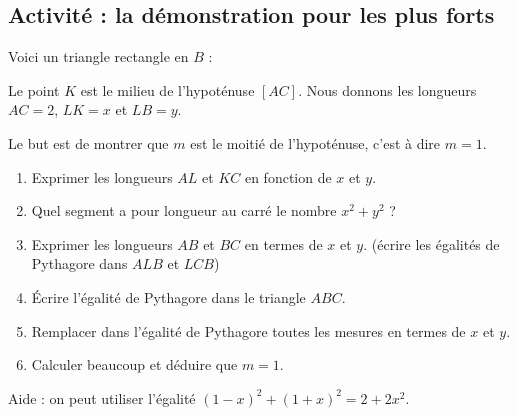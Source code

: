 
\subsection*{Activité : la démonstration pour les plus forts}

Voici un triangle rectangle en \( B\) :

\begin{center}

\end{center}
Le point \( K\) est le milieu de l'hypoténuse \( [AC]\). Nous donnons les longueurs \( AC=2\), \( LK=x\) et \( LB=y\).

Le but est de montrer que \( m\) est le moitié de l'hypoténuse, c'est à dire \( m=1\).

\begin{enumerate}
    \item
        Exprimer les longueurs \( AL\) et \( KC\) en fonction de \( x\) et \( y\).
    \item
        Quel segment a pour longueur au carré le nombre \( x^2+y^2\) ?
    \item
        Exprimer les longueurs \( AB\) et \( BC\) en termes de \( x\) et \( y\). (écrire les égalités de Pythagore dans \( ALB\) et \( LCB\))
    \item
        Écrire l'égalité de Pythagore dans le triangle \( ABC\).
    \item
        Remplacer dans l'égalité de Pythagore toutes les mesures en termes de \( x\) et \( y\).
    \item
        Calculer beaucoup et déduire que \( m=1\).
\end{enumerate}
Aide : on peut utiliser l'égalité \( (1-x)^2+(1+x)^2=2+2x^2\).
